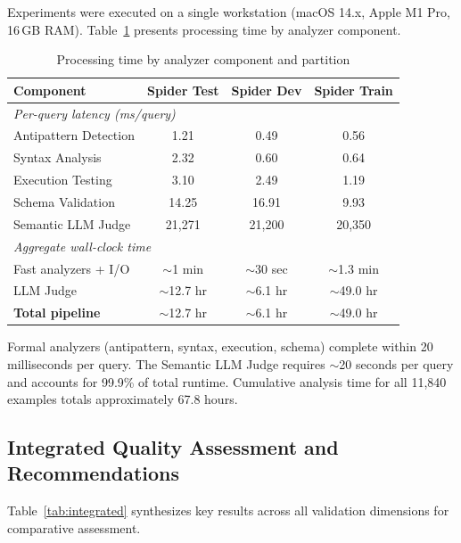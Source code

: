 \documentclass[print]{einformatica}
\begin{document}
Experiments were executed on a single workstation (macOS 14.x, Apple M1 Pro, 16\,GB RAM). Table~\ref{tab:performance} presents processing time by analyzer component.

\begin{table}[ht]
    \caption{Processing time by analyzer component and partition}
    \label{tab:performance}
    \centering
    \footnotesize
    \begin{tabular}{lccc}
        \toprule
        \textbf{Component} & \textbf{Spider Test} & \textbf{Spider Dev} & \textbf{Spider Train} \\
        \midrule
        \multicolumn{4}{l}{\textit{Per-query latency (ms/query)}} \\
        Antipattern Detection & 1.21 & 0.49 & 0.56 \\
        Syntax Analysis & 2.32 & 0.60 & 0.64 \\
        Execution Testing & 3.10 & 2.49 & 1.19 \\
        Schema Validation & 14.25 & 16.91 & 9.93 \\
        Semantic LLM Judge & 21,271 & 21,200 & 20,350 \\
        \midrule
        \multicolumn{4}{l}{\textit{Aggregate wall-clock time}} \\
        Fast analyzers + I/O & $\sim$1 min & $\sim$30 sec & $\sim$1.3 min \\
        LLM Judge & $\sim$12.7 hr & $\sim$6.1 hr & $\sim$49.0 hr \\
        \textbf{Total pipeline} & $\sim$12.7 hr & $\sim$6.1 hr & $\sim$49.0 hr \\
        \bottomrule
    \end{tabular}
\end{table}

Formal analyzers (antipattern, syntax, execution, schema) complete within 20 milliseconds per query. The Semantic LLM Judge requires $\sim$20 seconds per query and accounts for 99.9\% of total runtime. Cumulative analysis time for all 11,840 examples totals approximately 67.8 hours.

\subsection{Integrated Quality Assessment and Recommendations}\label{sec:integrated}

Table~\ref{tab:integrated} synthesizes key results across all validation dimensions for comparative assessment.
\end{document}
